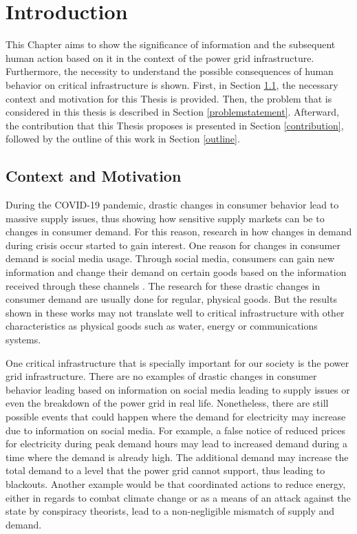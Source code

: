 \chapter{Introduction}

This Chapter aims to show the significance of information and 
the subsequent human action based on it
in the context of the power grid infrastructure.
Furthermore, the necessity to understand the possible consequences 
of human behavior on critical infrastructure is shown. 
First, in Section \ref{contextmotivation}, the necessary context and 
motivation for this Thesis is provided.
Then, the problem that is considered in this thesis is described 
in Section \ref{problemstatement}. Afterward, the contribution that this
Thesis proposes is presented in Section \ref{contribution}, 
followed by the outline of this work in Section \ref{outline}.

\section{Context and Motivation}
\label{contextmotivation}

During the COVID-19 pandemic, drastic changes in consumer behavior
lead to massive supply issues, thus showing how sensitive supply markets 
can be to changes in consumer demand.
For this reason, research in how changes in demand during crisis occur
started to gain interest. One reason for changes in consumer demand is 
social media usage. Through social media, consumers can gain new information
and change their demand on certain goods based on the information received 
through these channels \cite{naeem2021social}.
The research for these drastic changes in consumer demand are usually
done for regular, physical goods. But the results shown in these 
works may not translate well to critical infrastructure
with other characteristics as physical goods such as 
water, energy or communications systems.

One critical infrastructure that is specially important for 
our society is the power grid infrastructure.
There are no examples of drastic changes in consumer behavior leading
based on information on social media leading to supply issues or
even the breakdown of the power grid in real life. Nonetheless, there 
are still possible events that could happen where the demand for
electricity may increase due to information on social media.
For example, a false notice of reduced prices for electricity
during peak demand hours may lead to increased demand during 
a time where the demand is already high. The additional demand
may increase the total demand to a level that the power grid
cannot support, thus leading to blackouts.
Another example would be that coordinated actions to reduce
energy, either in regards to combat climate change \cite{earthday}
or as a means of an attack against the state by conspiracy theorists,
lead to a non-negligible mismatch of supply and demand.


